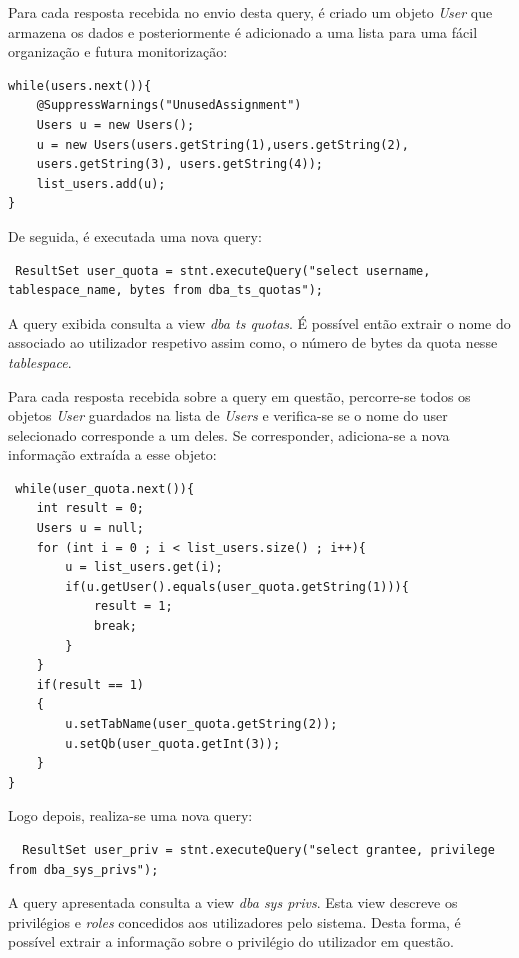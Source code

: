 Para cada resposta recebida no envio desta query, é criado um objeto \textit{User} que armazena os dados e posteriormente é adicionado a uma lista  para uma fácil organização e futura monitorização:
\vspace{2mm}
\begin{lstlisting}
while(users.next()){
    @SuppressWarnings("UnusedAssignment")
    Users u = new Users();
    u = new Users(users.getString(1),users.getString(2),
    users.getString(3), users.getString(4));
    list_users.add(u);
}
\end{lstlisting}
\vspace{2mm}
De seguida, é executada uma nova query:
\vspace{2mm}
\begin{lstlisting}
 ResultSet user_quota = stnt.executeQuery("select username, tablespace_name, bytes from dba_ts_quotas");
\end{lstlisting}
\vspace{2mm}
A query exibida consulta a view \textit{dba ts quotas}. É possível então extrair o nome do  associado ao utilizador respetivo assim como, o número de bytes da quota nesse \textit{tablespace}. 

Para cada resposta recebida sobre a query em questão, percorre-se todos os objetos \textit{User} guardados na lista de \textit{Users} e verifica-se se o nome do user selecionado corresponde a um deles. Se corresponder, adiciona-se a nova informação extraída a esse objeto:
\vspace{2mm}
\begin{lstlisting}
 while(user_quota.next()){
    int result = 0;
    Users u = null;
    for (int i = 0 ; i < list_users.size() ; i++){
        u = list_users.get(i);
        if(u.getUser().equals(user_quota.getString(1))){
            result = 1;
            break;
        }
    }
    if(result == 1)
    { 
        u.setTabName(user_quota.getString(2));
        u.setQb(user_quota.getInt(3));
    }  
}
\end{lstlisting}
\vspace{2mm}
Logo depois, realiza-se uma nova query:
\vspace{2mm}
\begin{lstlisting}
  ResultSet user_priv = stnt.executeQuery("select grantee, privilege from dba_sys_privs");
\end{lstlisting}
\vspace{2mm}
A query apresentada consulta a view \textit{ dba sys privs}. Esta view descreve os privilégios e \textit{roles} concedidos aos utilizadores pelo sistema. Desta forma, é possível extrair a informação sobre o privilégio do utilizador em questão.

